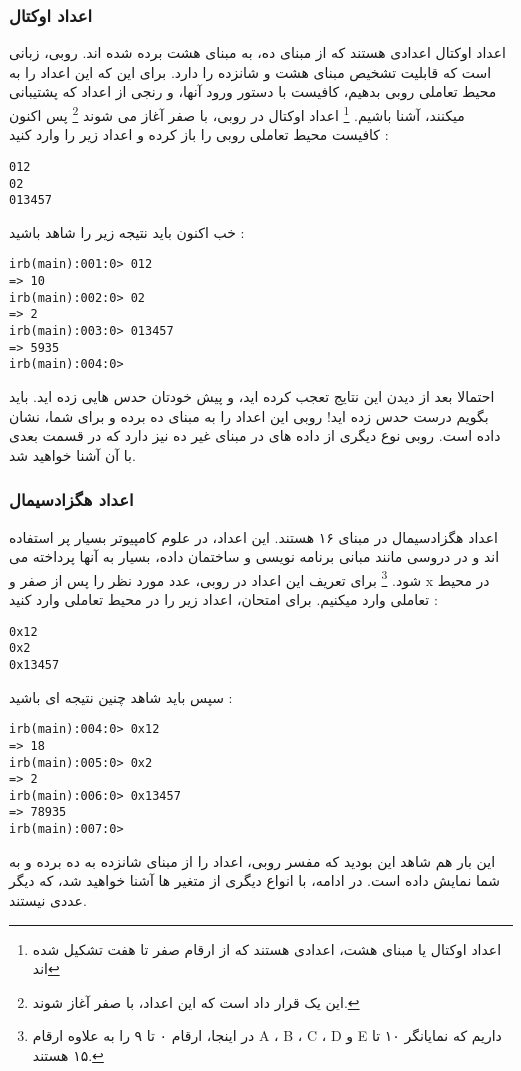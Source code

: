 \documentclass[11pt]{article}
\begin{document}
\subsubsection{اعداد اوکتال}
اعداد اوکتال
اعدادی هستند که از مبنای ده، به مبنای هشت برده شده اند. روبی، زبانی است که قابلیت تشخیص مبنای هشت و شانزده را دارد. برای این که این اعداد را به محیط تعاملی روبی بدهیم، کافیست با دستور ورود آنها، و رنجی از اعداد که پشتیبانی میکنند، آشنا باشیم.
\footnote{اعداد اوکتال یا مبنای هشت، اعدادی هستند که از ارقام صفر تا هفت تشکیل شده اند}
اعداد اوکتال در روبی، با صفر آغاز می شوند
\footnote{این یک قرار داد است که این اعداد، با صفر آغاز شوند.}
پس اکنون کافیست محیط تعاملی روبی را باز کرده و اعداد زیر را وارد کنید :

\begin{latin}
\begin{verbatim}
012
02
013457
\end{verbatim}
\end{latin}
خب اکنون باید نتیجه زیر را شاهد باشید :
\begin{latin}
\begin{verbatim}
irb(main):001:0> 012
=> 10
irb(main):002:0> 02
=> 2
irb(main):003:0> 013457
=> 5935
irb(main):004:0>
\end{verbatim}
\end{latin}
احتمالا بعد از دیدن این نتایج تعجب کرده اید، و پیش خودتان حدس هایی زده اید. باید بگویم درست حدس زده اید! روبی این اعداد را به مبنای ده برده و برای شما، نشان داده است. روبی نوع دیگری از داده های در مبنای غیر ده نیز دارد که در قسمت بعدی با آن آشنا خواهید شد. 
\subsubsection{اعداد هگزادسیمال}
اعداد هگزادسیمال
در مبنای ۱۶ هستند. این اعداد، در علوم کامپیوتر بسیار پر استفاده اند و در دروسی مانند مبانی برنامه نویسی و ساختمان داده، بسیار به آنها پرداخته می شود.
\footnote{
در اینجا، ارقام ۰ تا ۹ را به علاوه ارقام A ، B ، C ، D و E داریم که نمایانگر ۱۰ تا ۱۵ هستند.
}
برای تعریف این اعداد در روبی، عدد مورد نظر را پس از صفر و x در محیط تعاملی وارد میکنیم. برای امتحان، اعداد زیر را در محیط تعاملی وارد کنید :
\begin{latin}
\begin{verbatim}
0x12
0x2
0x13457
\end{verbatim}
\end{latin}
سپس باید شاهد چنین نتیجه ای باشید :
\begin{latin}
\begin{verbatim}
irb(main):004:0> 0x12
=> 18
irb(main):005:0> 0x2
=> 2
irb(main):006:0> 0x13457
=> 78935
irb(main):007:0> 
\end{verbatim}
\end{latin}
این بار هم شاهد این بودید که مفسر روبی، اعداد را از مبنای شانزده به ده برده و به شما نمایش داده است. در ادامه، با انواع دیگری از متغیر ها آشنا خواهید شد، که دیگر عددی نیستند.
\end{document}
